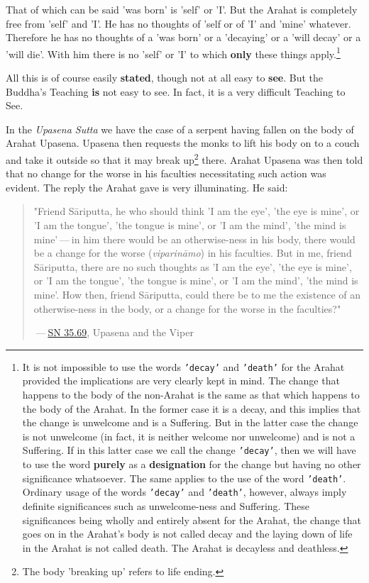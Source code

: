 That of which can be said 'was born' is 'self' or 'I'. But the Arahat is
completely free from 'self' and 'I'. He has no thoughts of 'self or of
'I' and 'mine' whatever. Therefore he has no thoughts of a 'was born' or
a 'decaying' or a 'will decay' or a 'will die'. With him there is no
'self' or 'I' to which \textbf{only} these things apply.\footnote{It is not impossible to use the words \texttt{'decay'} and \texttt{'death'} for the Arahat provided the implications are very clearly kept in mind. The change that happens to the body of the non-Arahat is the same as that which happens to the body of the Arahat. In the former case it is a decay, and this implies that the change is unwelcome and is a Suffering. But in the latter case the change is not unwelcome (in fact, it is neither welcome nor unwelcome) and is not a Suffering. If in this latter case we call the change \texttt{'decay'}, then we will have to use the word \textbf{purely} as a \textbf{designation} for the change but having no other significance whatsoever. The same applies to the use of the word \texttt{'death'}. Ordinary usage of the words \texttt{'decay'} and \texttt{'death'}, however, always imply definite significances such as unwelcome-ness and Suffering. These significances being wholly and entirely absent for the Arahat, the change that goes on in the Arahat’s body is not called decay and the laying down of life in the Arahat is not called death. The Arahat is decayless and deathless.}


All this is of course easily \textbf{stated}, though not at all easy to
\textbf{see}. But the Buddha’s Teaching \textbf{is} not easy to see. In fact, it is
a very difficult Teaching to See.


In the \emph{Upasena Sutta} we have the case of a serpent
having fallen on the body of Arahat Upasena. Upasena then requests the
monks to lift his body on to a couch and take it outside so that it may
break up\footnote{The body 'breaking up' refers to life ending.} there.
Arahat Upasena was then told that no change for the worse in his
faculties necessitating such action was evident. The reply the Arahat
gave is very illuminating. He said:


\begin{quotation}
"Friend Sāriputta, he who should think 'I am the eye', 'the eye is
mine', or 'I am the tongue', 'the tongue is mine', or 'I am the mind',
'the mind is mine' — in him there would be an otherwise-ness in his
body, there would be a change for the worse (\emph{viparināmo}) in his
faculties. But in me, friend Sāriputta, there are no such thoughts as 'I
am the eye', 'the eye is mine', or 'I am the tongue', 'the tongue is
mine', or 'I am the mind', 'the mind is mine'. How then, friend
Sāriputta, could there be to me the existence of an otherwise-ness in
the body, or a change for the worse in the faculties?"


 — \href{https://suttacentral.net/sn35.69/en/sujato}{SN 35.69}, Upasena and the Viper


\end{quotation}

